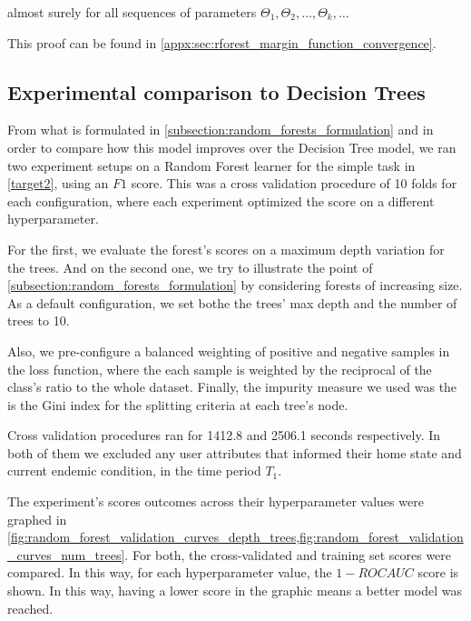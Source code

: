 almost surely for all sequences of parameters $\Theta_1,\Theta_2, \ldots, \Theta_k,\ldots$

This proof can be found in \cref{appx:sec:rforest_margin_function_convergence}.


\subsection{ Experimental comparison to Decision Trees}\label{subsection:random_forests_comparison_trees}

From what is formulated in \cref{subsection:random_forests_formulation} and in order to compare how this model improves over the Decision Tree model, we ran two experiment setups on a Random Forest learner for the simple task in \cref{target2}, using an $F1$ score.
This was a cross validation procedure of 10 folds for each configuration, where each experiment optimized the score on a different hyperparameter.

For the first, we evaluate the forest's scores on a maximum depth variation for the trees.
And on the second one, we try to illustrate the point of \cref{subsection:random_forests_formulation} by considering forests of increasing size.
As a default configuration, we set bothe the trees' max depth and the number of trees to 10.

Also, we pre-configure a balanced weighting of positive and negative samples in the loss function, where the each sample is weighted by the reciprocal of the class's ratio to the whole dataset.
Finally, the impurity measure  we used was the is the Gini index for the splitting criteria at each tree's node.

Cross validation procedures ran for 1412.8 and 2506.1 seconds respectively. In both of them we excluded any user attributes that informed their home state and current endemic condition, in the time period $T_1$.

The experiment's scores outcomes across their hyperparameter values were graphed in \cref{fig:random_forest_validation_curves_depth_trees,fig:random_forest_validation_curves_num_trees}.
For both, the cross-validated and training set scores were compared. In this way, for each hyperparameter value, the $1-ROC AUC$ score is shown.
In this way, having a lower score in the graphic means a better model was reached.


